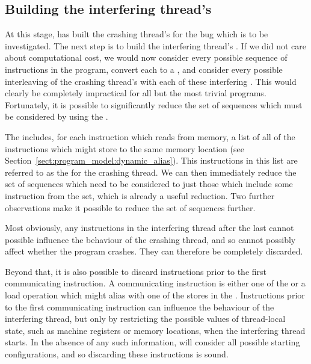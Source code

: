 \subsection{Building the interfering thread's \StateMachines}
\label{sect:derive:write_side}

At this stage, {\technique} has built the crashing thread's
{\StateMachine} for the bug which is to be investigated.  The next
step is to build the interfering thread's {\StateMachine}.  If we did
not care about computational cost, we would now consider every
possible sequence of \backref{$\alpha$} instructions in the program,
convert each to a {\StateMachine}, and consider every possible
interleaving of the crashing thread's {\StateMachine} with each of
these interfering {\StateMachines}.  This would clearly be completely
impractical for all but the most trivial programs.  Fortunately, it is
possible to significantly reduce the set of sequences which must be
considered by using the .

The  includes, for each instruction which reads
from memory, a list of all of the instructions which might store to
the same memory location (see
Section~\ref{sect:program_model:dynamic_alias}).  This instructions in
this list are referred to as the  for
the crashing thread.  We can then immediately reduce the set of
sequences which need to be considered to just those which include some
instruction from the  set, which is
already a useful reduction.  Two further observations make it possible
to reduce the set of sequences further.

Most obviously, any instructions in the interfering thread after the last
 cannot possible influence the behaviour of
the crashing thread, and so cannot possibly affect whether the program
crashes.  They can therefore be completely discarded.

Beyond that, it is also possible to discard instructions prior to the
first communicating instruction.  A communicating instruction is
either one of the  or a load operation
which might alias with one of the stores in the  {\StateMachine}.  Instructions prior to the first
communicating instruction can influence the behaviour of the
interfering thread, but only by restricting the possible values of
thread-local state, such as machine registers or memory locations,
when the interfering thread starts.  In the absence of any such
information, {\technique} will consider all possible starting
configurations, and so discarding these instructions is sound.

